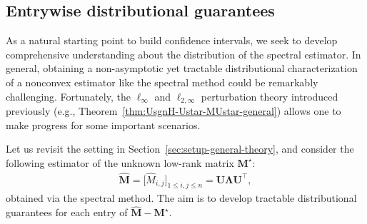 



\subsection{Entrywise distributional guarantees}
\label{sec:distribution-general}


As a natural starting point to build confidence intervals, 
we seek to develop comprehensive understanding about the distribution of the spectral estimator. 
In general, obtaining a non-asymptotic yet tractable distributional characterization of a nonconvex estimator like the spectral method 
could be remarkably challenging. 
Fortunately, the $\ell_{\infty}$ and $\ell_{2,\infty}$ perturbation theory introduced previously (e.g., Theorem~\ref{thm:UsgnH-Ustar-MUstar-general}) allows one to make progress for some important scenarios. 



Let us revisit the setting in Section~\ref{sec:setup-general-theory}, and consider the following estimator of the unknown low-rank matrix $\bm{M}^{\star}$:
%
\begin{align}
	\widehat{\bm{M}}=\big[\widehat{M}_{i,j} \big]_{1\leq i,j\leq n}=\bm{U}\bm{\Lambda}\bm{U}^{\top} ,
	\label{eq:estimator-M-hat-distribution}
\end{align}
%
obtained via the spectral method. The aim is to develop tractable distributional guarantees for each entry of $\widehat{\bm{M}}-\bm{M}^{\star}$. 


